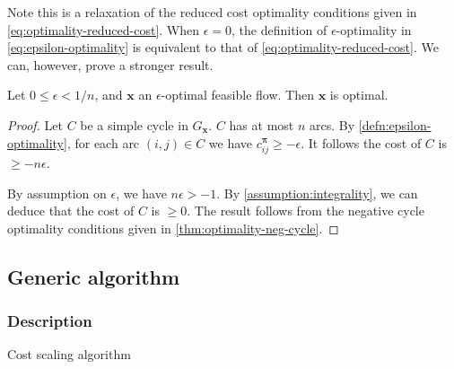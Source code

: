 \begin{remark}
Note this is a relaxation of the reduced cost optimality conditions given in \cref{eq:optimality-reduced-cost}. When $\epsilon = 0$, the definition of $\epsilon$-optimality in \cref{eq:epsilon-optimality} is equivalent to that of \cref{eq:optimality-reduced-cost}. We can, however, prove a stronger result.\\
\end{remark}

\begin{thm} \label{thm:epsilon-optimality-optimal}
Let $0 \leq \epsilon < 1/n$, and $\mathbf{x}$ an $\epsilon$-optimal feasible flow. Then $\mathbf{x}$ is optimal.
\end{thm}
\begin{proof}
Let $C$ be a simple cycle in $G_\mathbf{x}$. $C$ has at most $n$ arcs. By \cref{defn:epsilon-optimality}, for each arc $(i,j) \in C$ we have $c^{\boldsymbol{\pi}}_{ij} \geq -\epsilon$. It follows the cost of $C$ is $\geq -n\epsilon$.

By assumption on $\epsilon$, we have $n\epsilon > -1$. By \cref{assumption:integrality}, we can deduce that the cost of $C$ is $\geq 0$. The result follows from the negative cycle optimality conditions given in \cref{thm:optimality-neg-cycle}.
\end{proof}

\subsection{Generic algorithm}


\subsubsection{Description}



\begin{algorithm}
\begin{algorithmic}[1]
     
     
     
        \State {}
    \EndWhile
\end{algorithmic}
\caption{Cost scaling algorithm}
\label{algo:cost-scaling}
\end{algorithm}

